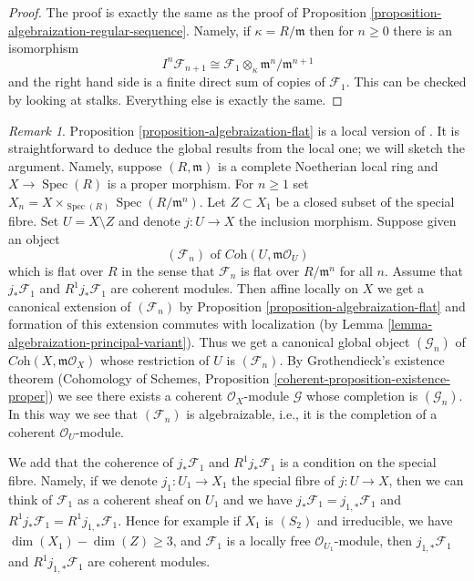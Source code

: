 \documentclass{stacks-project}
\theoremstyle{plain}
\theoremstyle{definition}
\theoremstyle{remark}
\newtheorem{remark}[subsection]{Remark}
\numberwithin{equation}{subsection}
\def\Spec{\mathop{\mathrm{Spec}}}
\begin{document}
\begin{proof}
The proof is exactly the same as the proof of
Proposition \ref{proposition-algebraization-regular-sequence}.
Namely, if $\kappa = R/\mathfrak m$ then for $n \geq 0$
there is an isomorphism
$$
I^n \mathcal{F}_{n + 1} \cong
\mathcal{F}_1 \otimes_\kappa \mathfrak m^n/\mathfrak m^{n + 1}
$$
and the right hand side is a finite direct sum of copies
of $\mathcal{F}_1$. This can be checked by looking at stalks.
Everything else is exactly the same.
\end{proof}

\begin{remark}
\label{remark-interesting-case-quater}
Proposition \ref{proposition-algebraization-flat} is a local version
of \cite[Theorem 2.10 (i)]{Baranovsky}. It is straightforward to deduce
the global results from the local one; we will sketch the argument.
Namely, suppose $(R, \mathfrak m)$
is a complete Noetherian local ring and $X \to \Spec(R)$ is a proper morphism.
For $n \geq 1$ set $X_n = X \times_{\Spec(R)} \Spec(R/\mathfrak m^n)$.
Let $Z \subset X_1$ be a closed subset of the special fibre.
Set $U = X \setminus Z$ and denote $j : U \to X$ the inclusion morphism.
Suppose given an object
$$
(\mathcal{F}_n) \text{ of } \textit{Coh}(U, \mathfrak m\mathcal{O}_U)
$$
which is flat over $R$ in the sense that $\mathcal{F}_n$ is flat over
$R/\mathfrak m^n$ for all $n$.
Assume that $j_*\mathcal{F}_1$ and $R^1j_*\mathcal{F}_1$ are coherent
modules. Then affine locally on $X$ we get a canonical extension
of $(\mathcal{F}_n)$ by
Proposition \ref{proposition-algebraization-flat}
and formation of this extension commutes with localization
(by Lemma \ref{lemma-algebraization-principal-variant}).
Thus we get a canonical global object $(\mathcal{G}_n)$ of
$\textit{Coh}(X, \mathfrak m\mathcal{O}_X)$
whose restriction of $U$ is $(\mathcal{F}_n)$.
By Grothendieck's existence theorem
(Cohomology of Schemes, Proposition
\ref{coherent-proposition-existence-proper})
we see there exists a coherent $\mathcal{O}_X$-module
$\mathcal{G}$ whose completion is $(\mathcal{G}_n)$.
In this way we see that $(\mathcal{F}_n)$ is algebraizable, i.e.,
it is the completion of a coherent $\mathcal{O}_U$-module.

\medskip\noindent
We add that the coherence of $j_*\mathcal{F}_1$ and $R^1j_*\mathcal{F}_1$
is a condition on the special fibre. Namely, if we denote
$j_1 : U_1 \to X_1$ the special fibre of $j : U \to X$, then we can
think of $\mathcal{F}_1$ as a coherent sheaf on $U_1$ and we have
$j_*\mathcal{F}_1 = j_{1, *}\mathcal{F}_1$ and
$R^1j_*\mathcal{F}_1 = R^1j_{1, *}\mathcal{F}_1$.
Hence for example if $X_1$ is $(S_2)$ and irreducible, we have
$\dim(X_1) - \dim(Z) \geq 3$, and $\mathcal{F}_1$ is a locally free
$\mathcal{O}_{U_1}$-module, then $j_{1, *}\mathcal{F}_1$ and
$R^1j_{1, *}\mathcal{F}_1$ are coherent modules.
\end{remark}
\end{document}
